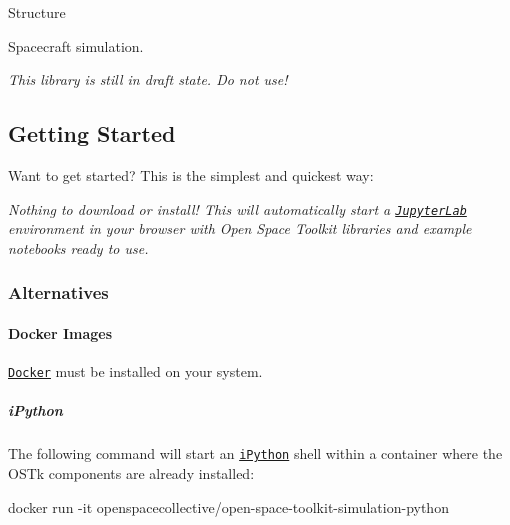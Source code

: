 Structure

\href{https://github.com/open-space-collective/open-space-toolkit-simulation/actions/workflows/build-test.yml}{\tt } \href{https://codecov.io/gh/open-space-collective/open-space-toolkit-simulation}{\tt } \href{https://open-space-collective.github.io/open-space-toolkit-simulation}{\tt } \href{https://badge.fury.io/gh/open-space-collective%2Fopen-space-toolkit-simulation}{\tt } \href{https://badge.fury.io/py/open-space-toolkit-simulation}{\tt } \href{https://opensource.org/licenses/Apache-2.0}{\tt }

Spacecraft simulation.

{\itshape This library is still in draft state. Do not use!}

\subsection*{Getting Started}

Want to get started? This is the simplest and quickest way\+:

\href{https://mybinder.org/v2/gh/open-space-collective/open-space-toolkit/main?urlpath=lab/tree/notebooks}{\tt }

{\itshape Nothing to download or install! This will automatically start a \href{https://jupyterlab.readthedocs.io/en/stable/}{\tt Jupyter\+Lab} environment in your browser with Open Space Toolkit libraries and example notebooks ready to use.}

\subsubsection*{Alternatives}

\paragraph*{Docker Images}

\href{https://www.docker.com/}{\tt Docker} must be installed on your system.

\subparagraph*{i\+Python}

The following command will start an \href{https://ipython.org/}{\tt i\+Python} shell within a container where the O\+S\+Tk components are already installed\+:


\begin{DoxyCode}
docker run -it openspacecollective/open-space-toolkit-simulation-python
\end{DoxyCode}


